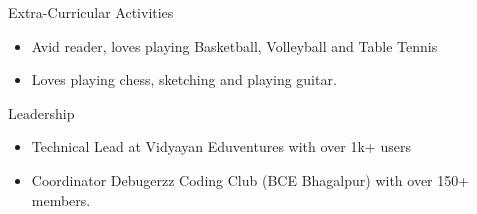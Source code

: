 \documentclass{resume} %
\begin{document}
\begin{rSection}{Extra-Curricular Activities} 
\begin{itemize}
    \item 	Avid reader, loves playing Basketball, Volleyball and Table Tennis
    \item	Loves playing chess, sketching and playing guitar.
\end{itemize}


\end{rSection}

\begin{rSection}{Leadership} 
\begin{itemize}
    \item Technical Lead at Vidyayan Eduventures with over 1k+ users
    \item Coordinator Debugerzz Coding Club (BCE Bhagalpur) with over 150+ members.
\end{itemize}


\end{rSection}
\end{document}
